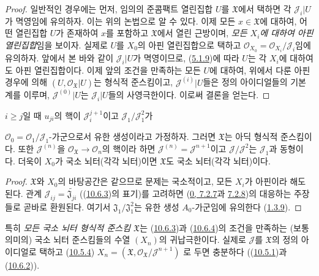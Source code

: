 \begin{proof}
일반적인 경우에는 먼저, 임의의 준콤팩트 열린집합 $U$를
$\mathfrak{X}$에서 택하면 각 $\mathscr{J}_i|U$가 멱영임에
유의하자. 이는 위의
논법으로 알 수 있다. 이제 모든 $x\in\mathfrak{X}$에 대하여,
어떤 열린집합 $U$가 존재하여 $x$를 포함하고 $\mathfrak{X}$에서 열린 근방이며,
\emph{모든 $X_i$에 대하여 아핀 열린집합}임을 보이자. 실제로
$U$를 $X_0$의 아핀 열린집합으로 택하고
$\mathscr{O}_{X_0}=\mathscr{O}_{X_i}/\mathscr{J}_i$임에 유의하자.
앞에서 본 바와 같이 $\mathscr{J}_i|U$가 멱영이므로,
(\hyperref[I.5.1.9-ko]{5.1.9})에 따라 $U$는 각 $X_i$에 대하여도
아핀 열린집합이다. 이제 앞의 조건을 만족하는 모든 $U$에 대하여,
위에서 다룬 아핀 경우에 의해 $(U,\mathscr{O}_{\mathfrak{X}}|U)$는
형식적 준스킴이고, $\mathscr{J}^{(i)}|U$들은 정의 아이디얼들의
기본계를 이루며, $\mathscr{J}^{(0)}|U$는
$\mathscr{J}_i|U$들의 사영극한이다. 이로써 결론을 얻는다.
\end{proof}

\begin{corollary}[10.6.4]
\label{I.10.6.4-ko}
$i\geq j$일 때 $u_{ji}$의 핵이
$\mathscr{J}_i^{j+1}$이고 $\mathscr{J}_1/\mathscr{J}_1^2$가


$\mathscr{O}_0=\mathscr{O}_1/\mathscr{J}_1$-가군으로서 유한
생성이라고 가정하자. 그러면 $\mathfrak{X}$는 아딕 형식적 준스킴이다.
또한 $\mathscr{J}^{(n)}$을
$\mathscr{O}_{\mathfrak{X}}\to\mathscr{O}_n$의 핵이라 하면
$\mathscr{J}^{(n)}=\mathscr{J}^{n+1}$이고
$\mathscr{J}/\mathscr{J}^2$는 $\mathscr{J}_1$과 동형이다. 더욱이
$X_0$가 국소 뇌터(각각 뇌터)이면 $\mathfrak{X}$도 국소 뇌터(각각
뇌터)이다.
\end{corollary}

\begin{proof}
$\mathfrak{X}$와 $X_0$의 바탕공간은 같으므로 문제는 국소적이고, 모든
$X_i$가 아핀이라 해도 된다. 관계
$\mathscr{J}_{ij}=\widetilde{\mathfrak{J}_{ji}}$
((\hyperref[I.10.6.3-ko]{10.6.3})의 표기)를 고려하면
(\hyperref[0.7.2.7-ko]{0, 7.2.7}과
\hyperref[0.7.2.8-ko]{7.2.8})의 대응하는 주장들로 곧바로 환원된다.
여기서 $\mathfrak{J}_1/\mathfrak{J}_1^2$는 유한 생성
$A_0$-가군임에 유의한다
(\hyperref[I.1.3.9-ko]{1.3.9}).
\end{proof}

특히 \emph{모든 국소 뇌터 형식적 준스킴
$\mathfrak{X}$}는
(\hyperref[I.10.6.3-ko]{10.6.3})과
(\hyperref[I.10.6.4-ko]{10.6.4})의 조건을 만족하는 (보통 의미의)
국소 뇌터 준스킴들의 수열 $(X_n)$의 귀납극한이다. 실제로
$\mathscr{J}$를 $\mathfrak{X}$의 정의 아이디얼로 택하고
(\hyperref[I.10.5.4-ko]{10.5.4})
$X_n=(\mathfrak{X},
\mathscr{O}_{\mathfrak{X}}/\mathscr{J}^{n+1})$
로 두면 충분하다
((\hyperref[I.10.5.1-ko]{10.5.1})과
(\hyperref[I.10.6.2-ko]{10.6.2})).

